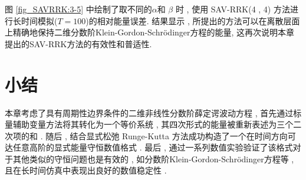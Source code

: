 图 \ref{fig_SAVRRK:3-5} 中绘制了取不同的$\alpha$和 $\beta$ 时 , 使用 SAV-RRK(4 , 4) 方法进行长时间模拟($T=100$)的相对能量误差.
结果显示 , 所提出的方法可以在离散层面上精确地保持二维分数阶Klein-Gordon-Schr{\"o}dinger方程的能量, 这再次说明本章提出的SAV-RRK方法的有效性和普适性.

\section{小结}\label{Section_SAVRRK: 7}
本章考虑了具有周期性边界条件的二维非线性分数阶薛定谔波动方程 , 首先通过标量辅助变量方法将其转化为一个等价系统 , 其四次形式的能量被重新表述为三个二次项的和 . 
随后 , 结合显式松弛 Runge-Kutta 方法成功构造了一个在时间方向可达任意高阶的显式能量守恒数值格式 . 
最后 , 通过一系列数值实验验证了该格式对于其他类似的守恒问题也是有效的 , 如分数阶Klein-Gordon-Schr{\"o}dinger方程等 , 且在长时间仿真中表现出良好的数值稳定性 . 
